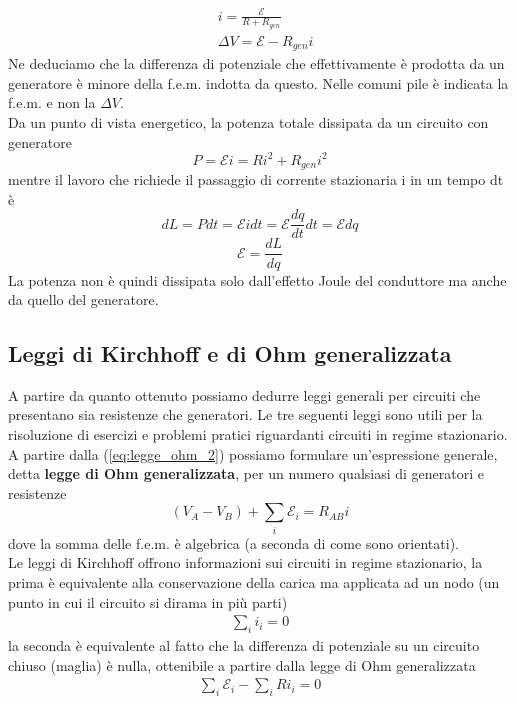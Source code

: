 \documentclass[
10pt, %
a4paper, %
oneside, %
headinclude,footinclude, %
BCOR5mm, %
]{scrartcl}
\begin{document}
\begin{align}\label{eq:legge_ohm_2}
	&i = \frac{\mathcal{E}}{R+R_{gen}}\nonumber \\
	&\Delta V = \mathcal{E}-R_{gen}i
\end{align}
Ne deduciamo che la differenza di potenziale che effettivamente è prodotta da un generatore è minore della f.e.m. indotta da questo. Nelle comuni pile è indicata la f.e.m. e non la $\Delta V$.\\
Da un punto di vista energetico, la potenza totale dissipata da un circuito con generatore
\[P = \mathcal{E} i = R i^2 + R_{gen}i^2\]
mentre il lavoro che richiede il passaggio di corrente stazionaria i in un tempo dt è 
\[dL = P dt =\mathcal{E} i dt= \mathcal{E}\frac{dq}{dt}dt=\mathcal{E} dq \]
\[\mathcal{E} = \frac{dL}{dq}\]
La potenza non è quindi dissipata solo dall'effetto Joule del conduttore ma anche da quello del generatore. 
\subsection{Leggi di Kirchhoff e di Ohm generalizzata}
A partire da quanto ottenuto possiamo dedurre leggi generali per circuiti che presentano sia resistenze che generatori. Le tre seguenti leggi sono utili per la risoluzione di esercizi e problemi pratici riguardanti circuiti in regime stazionario.\\
A partire dalla (\ref{eq:legge_ohm_2})  possiamo formulare un'espressione generale, detta \textbf{legge di Ohm generalizzata}, per un numero qualsiasi di generatori e resistenze
\[(V_A-V_B)+\sum_{i} \mathcal{E}_i = R_{AB}i \]
dove la somma delle f.e.m. è algebrica (a seconda di come sono orientati).\\
Le leggi di Kirchhoff offrono informazioni sui circuiti in regime stazionario, la prima è equivalente alla conservazione della carica ma applicata ad un nodo (un punto in cui il circuito si dirama in più parti)
\begin{align*}
	\sum_i i_i = 0
\end{align*}
la seconda è equivalente al fatto che la differenza di potenziale su un circuito chiuso (maglia) è nulla, ottenibile a partire dalla legge di Ohm generalizzata
\begin{align*}
	\sum_i \mathcal{E}_i -\sum_i R i_i =0
\end{align*}
\newpage
\end{document}
